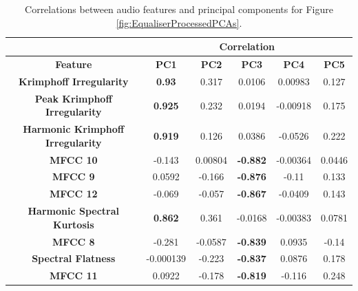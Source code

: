 		\begin{table}
			\centering
			\begin{tabular}{|c|c|c|c|c|c|}
				\cline{2-6}
				\multicolumn{1}{c|}{} & \multicolumn{5}{c|}{\bf{Correlation}} \tabularnewline
				\hline
				\bf{Feature} & \bf{PC1} & \bf{PC2} & \bf{PC3} & \bf{PC4} & \bf{PC5} \tabularnewline
				\hline
				\hline
				\bf{Krimphoff Irregularity} & \bf{0.93} & 0.317 & 0.0106 & 0.00983 & 0.127 \tabularnewline
				\hline
				\bf{Peak Krimphoff Irregularity} & \bf{0.925} & 0.232 & 0.0194 & -0.00918 & 0.175 \tabularnewline
				\hline
				\bf{Harmonic Krimphoff Irregularity} & \bf{0.919} & 0.126 & 0.0386 & -0.0526 & 0.222 \tabularnewline
				\hline
				\bf{MFCC 10} & -0.143 & 0.00804 & \bf{-0.882} & -0.00364 & 0.0446 \tabularnewline
				\hline
				\bf{MFCC 9} & 0.0592 & -0.166 & \bf{-0.876} & -0.11 & 0.133 \tabularnewline
				\hline
				\bf{MFCC 12} & -0.069 & -0.057 & \bf{-0.867} & -0.0409 & 0.143 \tabularnewline
				\hline
				\bf{Harmonic Spectral Kurtosis} & \bf{0.862} & 0.361 & -0.0168 & -0.00383 & 0.0781 \tabularnewline
				\hline
				\bf{MFCC 8} & -0.281 & -0.0587 & \bf{-0.839} & 0.0935 & -0.14 \tabularnewline
				\hline
				\bf{Spectral Flatness} & -0.000139 & -0.223 & \bf{-0.837} & 0.0876 & 0.178 \tabularnewline
				\hline
				\bf{MFCC 11} & 0.0922 & -0.178 & \bf{-0.819} & -0.116 & 0.248 \tabularnewline
				\hline
			\end{tabular}
			\caption{Correlations between audio features and principal components for Figure
				 \ref{fig:EqualiserProcessedPCAs}.}
			\label{fig:EqualiserProcessedCorrelations}
		\end{table}

